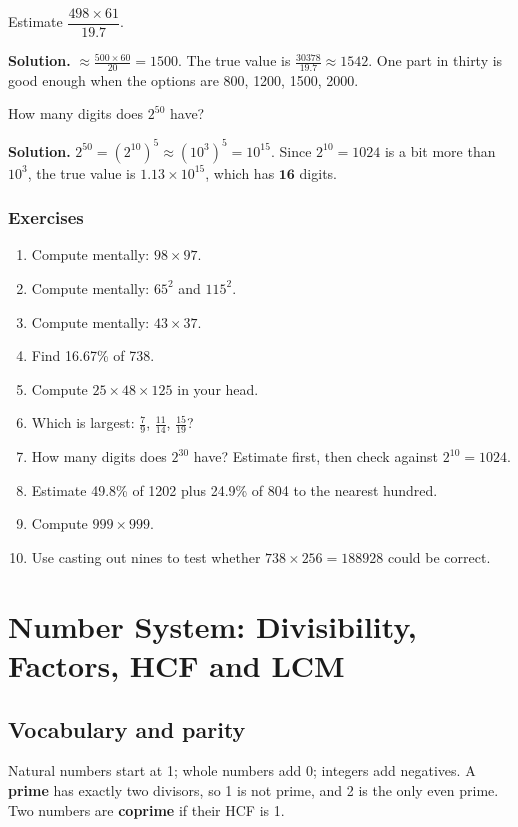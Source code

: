 \documentclass[11pt,a4paper,openany]{report}
\newenvironment{exercises}{\subsection*{Exercises \thechapter}\begin{enumerate}[label=\textbf{\thechapter.\arabic*},leftmargin=3.2em]}{\end{enumerate}}
\begin{document}
\begin{example}
Estimate $\dfrac{498\times 61}{19.7}$.

\textbf{Solution.} $\approx\frac{500\times60}{20}=1500$. The true value is $\frac{30378}{19.7}\approx1542$. One part in thirty is good enough when the options are 800, 1200, 1500, 2000.
\end{example}

\begin{example}
How many digits does $2^{50}$ have?

\textbf{Solution.} $2^{50}=(2^{10})^5\approx(10^3)^5=10^{15}$. Since $2^{10}=1024$ is a bit more than $10^3$, the true value is $1.13\times10^{15}$, which has $\mathbf{16}$ digits.
\end{example}

\begin{exercises}
\item Compute mentally: $98\times97$.
\item Compute mentally: $65^2$ and $115^2$.
\item Compute mentally: $43\times37$.
\item Find 16.67\% of 738.
\item Compute $25\times48\times125$ in your head.
\item Which is largest: $\frac79$, $\frac{11}{14}$, $\frac{15}{19}$?
\item How many digits does $2^{30}$ have? Estimate first, then check against $2^{10}=1024$.
\item Estimate 49.8\% of 1202 plus 24.9\% of 804 to the nearest hundred.
\item Compute $999\times999$.
\item Use casting out nines to test whether $738\times 256=188928$ could be correct.
\end{exercises}

\chapter{Number System: Divisibility, Factors, HCF and LCM}\label{ch:numsys}

\section{Vocabulary and parity}
Natural numbers start at 1; whole numbers add 0; integers add negatives. A \textbf{prime} has exactly two divisors, so 1 is not prime, and 2 is the only even prime. Two numbers are \textbf{coprime} if their HCF is 1.
\end{document}
